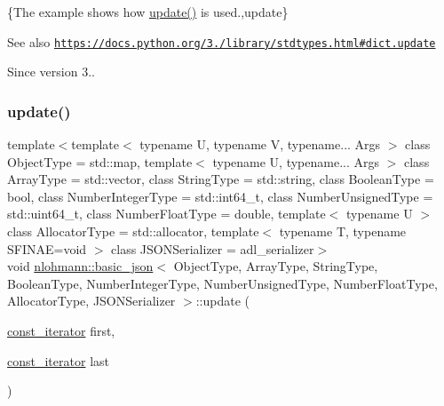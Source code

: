 \{The example shows how {\ttfamily \mbox{\hyperlink{classnlohmann_1_1basic__json_a1cfa9ae5e7c2434cab4cfe69bffffe11}{update()}}} is used.,update\}

\begin{DoxySeeAlso}{See also}
\href{https://docs.python.org/3.6/library/stdtypes.html#dict.update}{\tt https\+://docs.\+python.\+org/3./library/stdtypes.\+html\#dict.\+update}
\end{DoxySeeAlso}
\begin{DoxySince}{Since}
version 3.. 
\end{DoxySince}
\mbox{\label{classnlohmann_1_1basic__json_a27921dafadb3bbefd180235ec763e3ea}} 
\subsubsection{\texorpdfstring{update()}{update()}\hspace{0.1cm}{\footnotesize\ttfamily [2/2]}}
{\footnotesize\ttfamily template$<$template$<$ typename U, typename V, typename... Args $>$ class Object\+Type = std\+::map, template$<$ typename U, typename... Args $>$ class Array\+Type = std\+::vector, class String\+Type  = std\+::string, class Boolean\+Type  = bool, class Number\+Integer\+Type  = std\+::int64\+\_\+t, class Number\+Unsigned\+Type  = std\+::uint64\+\_\+t, class Number\+Float\+Type  = double, template$<$ typename U $>$ class Allocator\+Type = std\+::allocator, template$<$ typename T, typename S\+F\+I\+N\+A\+E=void $>$ class J\+S\+O\+N\+Serializer = adl\+\_\+serializer$>$ \\
void \mbox{\hyperlink{classnlohmann_1_1basic__json}{nlohmann\+::basic\+\_\+json}}$<$ Object\+Type, Array\+Type, String\+Type, Boolean\+Type, Number\+Integer\+Type, Number\+Unsigned\+Type, Number\+Float\+Type, Allocator\+Type, J\+S\+O\+N\+Serializer $>$\+::update (\begin{DoxyParamCaption}\item[{\mbox{\hyperlink{classnlohmann_1_1basic__json_a41a70cf9993951836d129bb1c2b3126a}{const\+\_\+iterator}}}]{first,  }\item[{\mbox{\hyperlink{classnlohmann_1_1basic__json_a41a70cf9993951836d129bb1c2b3126a}{const\+\_\+iterator}}}]{last }\end{DoxyParamCaption})\hspace{0.3cm}{\ttfamily [inline]}}



